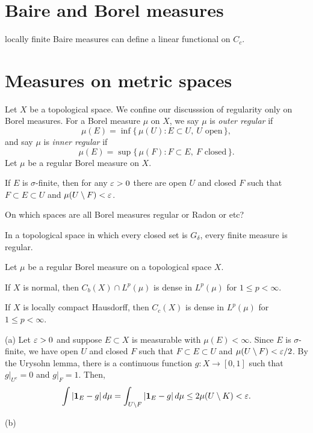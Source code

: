 \documentclass{../note}
\begin{document}
\section{Baire and Borel measures}
locally finite Baire measures can define a linear functional on $C_c$.


\section{Measures on metric spaces}

\begin{prb}
Let $X$ be a topological space.
We confine our discusssion of regularity only on Borel measures.
For a Borel measure $\mu$ on $X$, we say $\mu$ is \emph{outer regular} if
\[\mu(E)=\inf\{\,\mu(U):E\subset U,\ U\text{ open}\,\},\]
and say $\mu$ is \emph{inner regular} if
\[\mu(E)=\sup\{\,\mu(F):F\subset E,\ F\text{ closed}\,\}.\]
Let $\mu$ be a regular Borel measure on $X$.
\begin{parts}
\item If $E$ is $\sigma$-finite, then for any $\varepsilon>0$ there are open $U$ and closed $F$ such that $F\subset E\subset U$ and $\mu(U\setminus F)<\varepsilon$.
\end{parts}
\end{prb}





\begin{prb}
On which spaces are all Borel measures regular or Radon or etc?

\begin{parts}
\item In a topological space in which every closed set is $G_\delta$, every finite measure is regular.
\end{parts}
\end{prb}





\begin{prb}
Let $\mu$ be a regular Borel measure on a topological space $X$.
\begin{parts}
\item If $X$ is normal, then $C_b(X)\cap L^p(\mu)$ is dense in $L^p(\mu)$ for $1\le p<\infty$.
\item If $X$ is locally compact Hausdorff, then $C_c(X)$ is dense in $L^p(\mu)$ for $1\le p<\infty$.
\end{parts}
\end{prb}
\begin{pf}
(a)
Let $\varepsilon>0$ and suppose $E\subset X$ is measurable with $\mu(E)<\infty$.
Since $E$ is $\sigma$-finite, we have open $U$ and closed $F$ such that $F\subset E\subset U$ and $\mu(U\setminus F)<\varepsilon/2$.
By the Urysohn lemma, there is a continuous function $g:X\to[0,1]$ such that $g|_{U^c}=0$ and $g|_F=1$.
Then,
\[\int|\mathbf{1}_E-g|\,d\mu=\int_{U\setminus F}|\mathbf{1}_E-g|\,d\mu\le2\mu(U\setminus K)<\varepsilon.\]

(b)
\end{pf}
\end{document}
